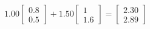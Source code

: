 \documentclass[preview]{standalone}
\begin{document}
\begin{align*}
1.00 \begin{bmatrix} 0.8 \\ 0.5 \end{bmatrix} + 1.50 \begin{bmatrix} 1 \\ 1.6 \end{bmatrix} = \begin{bmatrix} 2.30 \\ 2.89 \end{bmatrix}
\end{align*}
\end{document}

